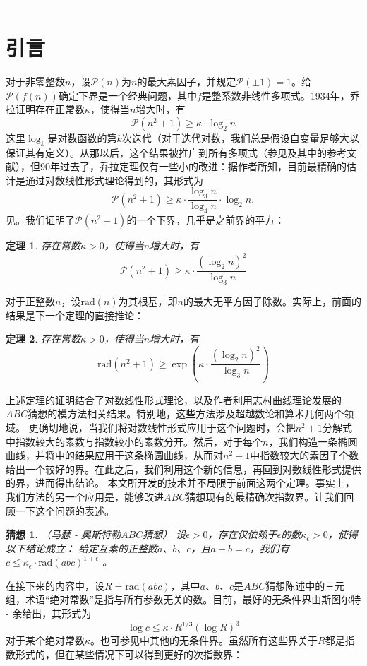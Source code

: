 \documentclass{article}
\newtheorem{theorem}{定理}
\newtheorem{conjecture}{猜想}
\begin{document}
\newpage
\hrule
\part{引言}


对于非零整数\(n\)，设\(\mathscr{P}(n)\)为\(n\)的最大素因子，并规定\(\mathscr{P}(\pm1)=1\)。给\(\mathscr{P}(f(n))\)确定下界是一个经典问题，其中\(f\)是整系数非线性多项式。1934年，乔拉\cite{1}证明存在正常数\(\kappa\)，使得当\(n\)增大时，有
\begin{equation}
\tag{1.1}
\mathscr{P}\left(n^{2}+1\right) \geq \kappa \cdot \log _{2} n
\end{equation}
这里\(\log_{k}\)是对数函数的第\(k\)次迭代（对于迭代对数，我们总是假设自变量足够大以保证其有定义）。从那以后，这个结果被推广到所有多项式（参见\cite{9}及其中的参考文献），但90年过去了，乔拉定理仅有一些小的改进：据作者所知，目前最精确的估计是通过对数线性形式理论得到的，其形式为
\[
\mathscr{P}\left(n^{2}+1\right) \geq \kappa \cdot \frac{\log _{3} n}{\log _{4} n} \cdot \log _{2} n,
\]
见\cite{9}。我们证明了\(\mathscr{P}(n^{2}+1)\)的一个下界，几乎是之前界的平方：
\setcounter{theorem}{0} 
\renewcommand{\thetheorem}{1.\arabic{theorem}}
\begin{theorem}
存在常数\(\kappa>0\)，使得当\(n\)增大时，有
\[
\mathscr{P}\left(n^{2}+1\right) \geq \kappa \cdot \frac{\left(\log _{2} n\right)^{2}}{\log _{3} n} 
\]
\end{theorem}
对于正整数\(n\)，设\(\text{rad}(n)\)为其根基，即\(n\)的最大无平方因子除数。实际上，前面的结果是下一个定理的直接推论：
\begin{theorem}
存在常数\(\kappa>0\)，使得当\(n\)增大时，有
\[
\text{rad}\left(n^{2}+1\right) \geq \exp \left(\kappa \cdot \frac{\left(\log _{2} n\right)^{2}}{\log _{3} n}\right) 
\]
\end{theorem}
上述定理的证明结合了对数线性形式理论，以及作者利用志村曲线理论\cite{7}发展的\(ABC\)猜想的模方法相关结果。特别地，这些方法涉及超越数论和算术几何两个领域。
更确切地说，当我们将对数线性形式应用于这个问题时，会把\(n^{2}+1\)分解式中指数较大的素数与指数较小的素数分开。然后，对于每个\(n\)，我们构造一条椭圆曲线，并将\cite{7}中的结果应用于这条椭圆曲线，从而对\(n^{2}+1\)中指数较大的素因子个数给出一个较好的界。在此之后，我们利用这个新的信息，再回到对数线性形式提供的界，进而得出结论。
本文所开发的技术并不局限于前面这两个定理。事实上，我们方法的另一个应用是，能够改进\(ABC\)猜想现有的最精确次指数界。让我们回顾一下这个问题的表述。
\setcounter{theorem}{3}
\renewcommand{\theconjecture}{1.\arabic{theorem}}
\begin{conjecture}（马瑟 - 奥斯特勒\(ABC\)猜想）
设\(\epsilon>0\)，存在仅依赖于\(\epsilon\)的数\(\kappa_{\epsilon}>0\)，使得以下结论成立：
给定互素的正整数\(a\)、\(b\)、\(c\)，且\(a + b = c\)，我们有\(c \leq \kappa_{\epsilon} \cdot \text{rad}(abc)^{1+\epsilon}\) 。
\end{conjecture}
在接下来的内容中，设\(R = \text{rad}(abc)\)，其中\(a\)、\(b\)、\(c\)是\(ABC\)猜想陈述中的三元组，术语“绝对常数”是指与所有参数无关的数。目前，最好的无条件界由斯图尔特 - 余\cite{12}给出，其形式为
\[
\log c \leq \kappa \cdot R^{1 / 3}(\log R)^{3}
\]
对于某个绝对常数\(\kappa\)。也可参见\cite{5,10,11}中其他的无条件界。虽然所有这些界关于\(R\)都是指数形式的，但在某些情况下可以得到更好的次指数界：
\end{document}
